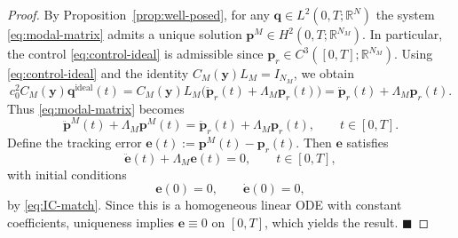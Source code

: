 \documentclass[11pt,a4paper]{article}
\numberwithin{equation}{section}
\newcommand{\R}{\mathbb{R}}
\begin{document}
\begin{proof}
By Proposition~\ref{prop:well-posed}, for any $\mathbf q\in L^2(0,T;\R^N)$ the system \eqref{eq:modal-matrix} admits a unique solution $\bm p^M\in H^2(0,T;\R^{N_M})$. In particular, the control \eqref{eq:control-ideal} is admissible since $\bm p_r\in C^3([0,T];\R^{N_M})$.
\newline
Using \eqref{eq:control-ideal} and the identity $C_M(\mathbf y)L_M=I_{N_M}$, we obtain
\[
 c_0^2 C_M(\mathbf y)\mathbf q^{\mathrm{ideal}}(t)
 =C_M(\mathbf y)L_M \bigl(\ddot{\bm{p}}_r(t)+\Lambda_M\bm{p}_r(t)\bigr)
 =\ddot{\bm{p}}_r(t)+\Lambda_M\bm{p}_r(t).
\]
Thus \eqref{eq:modal-matrix} becomes
\[
 \ddot{\bm{p}}^M(t)+\Lambda_M\bm{p}^M(t)
 =\ddot{\bm{p}}_r(t)+\Lambda_M\bm{p}_r(t),\qquad t\in[0,T].
\]
Define the tracking error $\bm{e}(t):=\bm{p}^M(t)-\bm{p}_r(t)$. Then $\bm e$ satisfies
\[
 \ddot{\bm{e}}(t)+\Lambda_M\bm{e}(t)=0,\qquad t\in[0,T],
\]
with initial conditions
\[
 \bm{e}(0)=0,\qquad \dot{\bm{e}}(0)=0,
\]
by \eqref{eq:IC-match}. Since this is a homogeneous linear ODE with constant coefficients, uniqueness implies $\bm e\equiv 0$ on $[0,T]$, which yields the result. \hfill $\blacksquare$
\end{proof}
\end{document}
